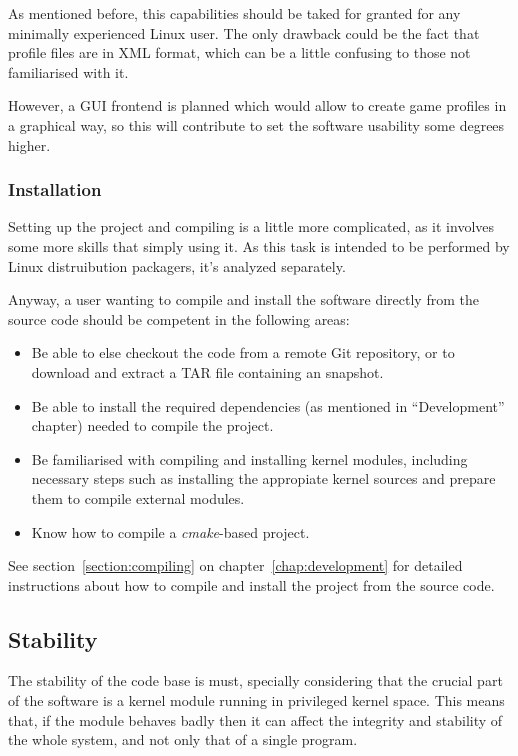 As mentioned before, this capabilities should be taked for granted for any minimally experienced Linux user. The only drawback could be the fact that profile files are in XML format, which can be a little confusing to those not familiarised with it. 

However, a GUI frontend is planned which would allow to create game profiles in a graphical way, so this will contribute to set the software usability some degrees higher.

\subsubsection{Installation}
Setting up the project and compiling is a little more complicated, as it involves some more skills that simply using it. As this task is intended to be performed by Linux distruibution packagers, it's analyzed separately.

Anyway, a user wanting to compile and install the software directly from the source code should be competent in the following areas:
\begin{itemize}
  \item Be able to else checkout the code from a remote Git repository, or to download and extract a TAR file containing an snapshot.
  \item Be able to install the required dependencies (as mentioned in ``Development'' chapter) needed to compile the project.
  \item Be familiarised with compiling and installing kernel modules, including necessary steps such as installing the appropiate kernel sources and prepare them to compile external modules.
  \item Know how to compile a \emph{cmake}-based project.
\end{itemize}

See section~\ref{section:compiling} on chapter~\ref{chap:development} for detailed instructions about how to compile and install the project from the source code.

\subsection{Stability}
The stability of the code base is must, specially considering that the crucial part of the software is a kernel module running in privileged kernel space. This means that, if the module behaves badly then it can affect the integrity and stability of the whole system, and not only that of a single program.

